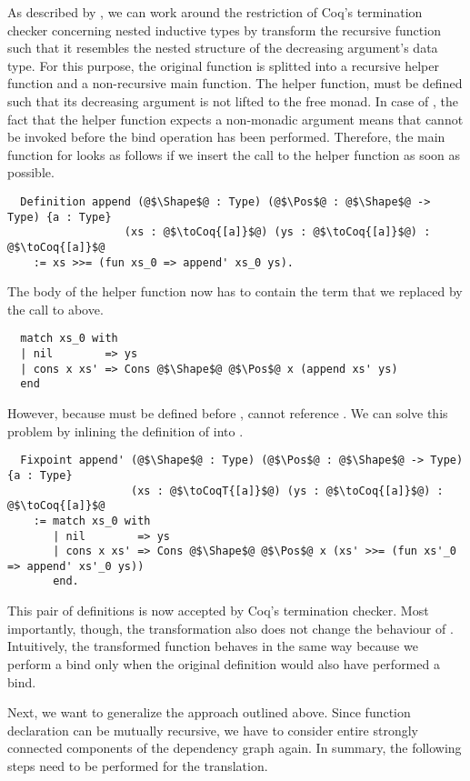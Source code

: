 As described by \cite{Dylus:2018}, we can work around the restriction of Coq's termination checker concerning nested inductive types by transform the recursive function such that it resembles the nested structure of the decreasing argument's data type.
For this purpose, the original function is splitted into a recursive helper function and a non-recursive main function.
The helper function, must be defined such that its decreasing argument is not lifted to the free monad.
In case of , the fact that the helper function  expects a non-monadic argument means that  cannot be invoked before the bind operation has been performed.
Therefore, the main function for  looks as follows if we insert the call to the helper function as soon as possible.
\begin{verbatim}
  Definition append (@$\Shape$@ : Type) (@$\Pos$@ : @$\Shape$@ -> Type) {a : Type}
                  (xs : @$\toCoq{[a]}$@) (ys : @$\toCoq{[a]}$@) : @$\toCoq{[a]}$@
    := xs >>= (fun xs_0 => append' xs_0 ys).
\end{verbatim}
The body of the helper function now has to contain the  term that we replaced by the call to  above.
\begin{verbatim}
  match xs_0 with
  | nil        => ys
  | cons x xs' => Cons @$\Shape$@ @$\Pos$@ x (append xs' ys)
  end
\end{verbatim}
However, because  must be defined before ,  cannot reference .
We can solve this problem by inlining the definition of  into .
\begin{verbatim}
  Fixpoint append' (@$\Shape$@ : Type) (@$\Pos$@ : @$\Shape$@ -> Type) {a : Type}
                   (xs : @$\toCoqT{[a]}$@) (ys : @$\toCoq{[a]}$@) : @$\toCoq{[a]}$@
    := match xs_0 with
       | nil        => ys
       | cons x xs' => Cons @$\Shape$@ @$\Pos$@ x (xs' >>= (fun xs'_0 => append' xs'_0 ys))
       end.
\end{verbatim}
This pair of definitions is now accepted by Coq's termination checker.
Most importantly, though, the transformation also does not change the behaviour of .
Intuitively, the transformed function behaves in the same way because we perform a bind only when the original definition would also have performed a bind.

Next, we want to generalize the approach outlined above.
Since function declaration can be mutually recursive, we have to consider entire strongly connected components of the dependency graph again.
In summary, the following steps need to be performed for the translation.

